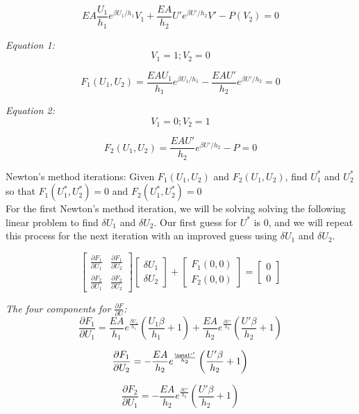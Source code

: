 \documentclass[12pt,american]{article}
\def\beq{\begin{equation}}
\def\eeq{\end{equation}}
\begin{document}
\beq
EA \frac{U_1}{h_1}e^{\beta U_1/h_1}V_1 + \frac{EA}{h_2}U' e^{\beta U'/h_2}V' - P(V_2) = 0
\eeq

{\em Equation 1:}
\beq
V_1 = 1; V_2 = 0
\eeq

\beq
F_1(U_1,U_2) = \frac{EAU_1}{h_1}e^{\beta U_1/h_1} - \frac{EAU'}{h_2}e^{\beta U'/h_2} = 0
\eeq

{\em Equation 2:}
\beq
V_1 = 0; V_2 = 1
\eeq

\beq
F_2(U_1,U_2) = \frac{EAU'}{h_2}e^{\beta U'/h_2} - P = 0
\eeq

Newton's method iterations:
Given $F_1(U_1,U_2)$ and $F_2(U_1,U_2)$, find $U_1^*$ and $U_2^*$ so that $F_1(U_1^*,U_2^*) = 0$ and $F_2(U_1^*,U_2^*)=0$
\\
For the first Newton's method iteration, we will be solving solving the following linear problem to find $\delta U_1$ and $\delta U_2$. Our first guess for $U^*$ is 0, and we will repeat this process for the next iteration with an improved guess using $\delta U_1$ and $\delta U_2$.


\beq
\begin{bmatrix} \frac{\partial F_1}{\partial U_1} & \frac{\partial F_1}{\partial U_2} \\
                \frac{\partial F_2}{\partial U_1} & \frac{\partial F_2}{\partial U_2}
\end{bmatrix}
\begin{bmatrix} \delta U_1 \\
                \delta U_2
\end{bmatrix} +
\begin{bmatrix} F_1(0,0) \\
                F_2(0,0)
\end{bmatrix} =
\begin{bmatrix} 0 \\ 0
\end{bmatrix}
\eeq

{\em The four components for $\frac{\partial F}{\partial U}$:}
\beq
\frac{\partial F_1}{\partial U_1} = \frac{EA}{h_1} e^{\frac{\beta U_1}{h_1}} \left( \frac{U_1 \beta}{h_1} + 1 \right) + \frac{EA}{h_2} e^{\frac{\beta U'}{h_2}} \left( \frac{U' \beta}{h_2} + 1 \right)
\eeq

\beq
\frac{\partial F_1}{\partial U_2} = - \frac{EA}{h_2} e^{\frac{\bets U'}{h_2}} \left( \frac{U' \beta}{h_2} + 1 \right)
\eeq

\beq
\frac{\partial F_2}{\partial U_1} = - \frac{EA}{h_2} e^{\frac{\beta U'}{h_2}} \left( \frac{U' \beta}{h_2} + 1 \right)
\eeq
\end{document}
